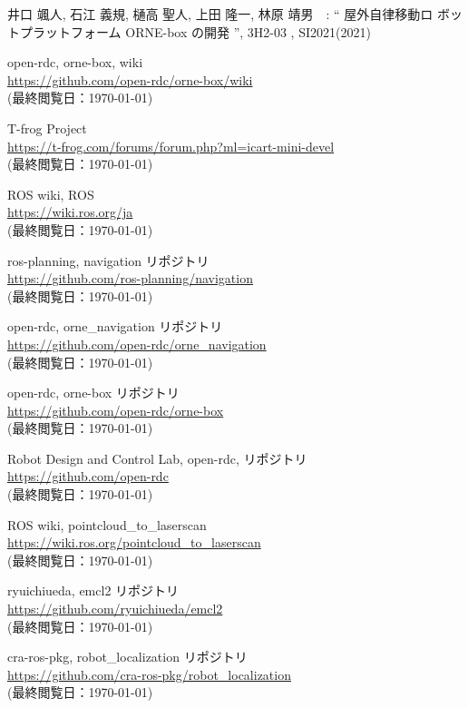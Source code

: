 \documentclass[twocolumn, 9pt]{jsproceedings}
\begin{document}
\newpage

\footnotesize
\begin{thebibliography}{99}
井口 颯人, 石江 義規, 樋高 聖人, 上田 隆一, 林原 靖男　: “ 屋外自律移動ロ
ボットプラットフォーム ORNE-box の開発 ”, 3H2-03 , SI2021(2021)

open-rdc, orne-box, wiki\\
\url{https://github.com/open-rdc/orne-box/wiki}\\
(最終閲覧日：\today)

T-frog Project\\
\url{https://t-frog.com/forums/forum.php?ml=icart-mini-devel}\\
(最終閲覧日：\today)

ROS wiki, ROS\\
\url{https://wiki.ros.org/ja}\\
(最終閲覧日：\today)

ros-planning, navigation リポジトリ\\
\url{https://github.com/ros-planning/navigation}\\
(最終閲覧日：\today)

open-rdc, orne\_navigation リポジトリ\\
\url{https://github.com/open-rdc/orne_navigation}\\
(最終閲覧日：\today)

open-rdc, orne-box リポジトリ\\
\url{https://github.com/open-rdc/orne-box}\\
(最終閲覧日：\today)

Robot Design and Control Lab, open-rdc, リポジトリ\\
\url{https://github.com/open-rdc}\\
(最終閲覧日：\today)

ROS wiki, pointcloud\_to\_laserscan\\
\url{https://wiki.ros.org/pointcloud_to_laserscan}\\
(最終閲覧日：\today)

ryuichiueda, emcl2 リポジトリ\\
\url{https://github.com/ryuichiueda/emcl2}\\
(最終閲覧日：\today)

cra-ros-pkg, robot\_localization リポジトリ\\
\url{https://github.com/cra-ros-pkg/robot_localization}\\
(最終閲覧日：\today)


\end{thebibliography}
\end{document}
